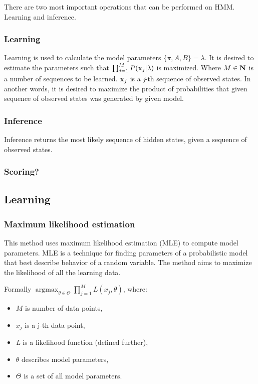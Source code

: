 \documentclass[thesis=B,english]{FITthesis}[2012/06/26]
\DeclareMathOperator*{\argmax}{argmax} %
\begin{document}
There are two most important operations that can be performed on HMM. Learning and inference.

\subsubsection{Learning}

Learning is used to calculate the model parameters $\{\pi, A, B\} = \lambda$. It is desired to estimate the parameters such that $\prod_{j=1}^{M} P(\textbf x_j | \lambda )$ is maximized. Where $M \in \textbf N$ is a number of sequences to be learned. $\textbf x_j$ is a \emph{j}-th sequence of observed states. In another words, it is desired to maximize the product of probabilities that given sequence of observed states was generated by given model.

\subsubsection{Inference}

Inference returns the most likely sequence of hidden states, given a sequence of observed states.

\subsubsection{Scoring?}

\subsection{Learning}

\subsubsection{Maximum likelihood estimation}

This method uses maximum likelihood estimation (MLE) to compute model parameters. MLE is a technique for finding parameters of a probabilistic model that best describe behavior of a random variable. The method aims to maximize the likelihood of all the learning data.

Formally $\argmax_{\theta \in \Theta} \prod_{j=1}^{M} L(x_j, \theta)$, where:

\begin{itemize}

\item $M$ is number of data points,
\item $x_j$ is a j-th data point,
\item \emph{L} is a likelihood function (defined further),
\item $\theta$ describes model parameters,
\item $\Theta$ is a set of all model parameters.

\end{itemize}
\end{document}
